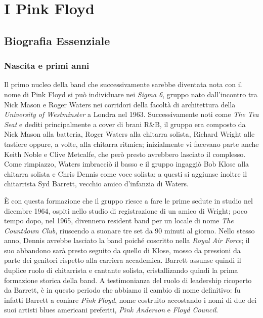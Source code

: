 \documentclass[class=book, crop=false, oneside, 12pt]{standalone}
\begin{document}
    \chapter{I Pink Floyd}

    \section{Biografia Essenziale}
    \subsection{Nascita e primi anni}
    Il primo nucleo della band che successivamente sarebbe diventata nota con il nome di Pink Floyd si può individuare nei \emph{Sigma 6}, gruppo nato dall'incontro tra Nick Mason e Roger Waters nei corridori della facoltà di architettura della \emph{University of Westminster} a Londra nel 1963. Successivamente noti come \emph{The Tea Seat} e dediti principalmente a cover di brani R\&B, il gruppo era composto da Nick Mason alla batteria, Roger Waters alla chitarra solista, Richard Wright alle tastiere oppure, a volte, alla chitarra ritmica; inizialmente vi facevano parte anche Keith Noble e Clive Metcalfe, che però presto avrebbero lasciato il complesso. Come rimpiazzo, Waters imbracciò il basso e il gruppo ingaggiò Bob Klose alla chitarra solista e Chris Dennis come voce solista; a questi si aggiunse inoltre il chitarrista Syd Barrett, vecchio amico d'infanzia di Waters.

    È con questa formazione che il gruppo riesce a fare le prime sedute in studio nel dicembre 1964, ospiti nello studio di registrazione di un amico di Wright; poco tempo dopo, nel 1965, divennero resident band per un locale di nome \emph{The Countdown Club}, riuscendo a suonare tre set da 90 minuti al giorno. Nello stesso anno, Dennis avrebbe lasciato la band poiché coscritto nella \emph{Royal Air Force}; il suo abbandono sarà presto seguito da quello di Klose, mosso da pressioni da parte dei genitori rispetto alla carriera accademica. Barrett assunse quindi il duplice ruolo di chitarrista e cantante solista, cristallizando quindi la prima formazione storica della band. A testimonianza del ruolo di leadership ricoperto da Barrett, è in questo periodo che abbiamo il cambio di nome definitivo: fu infatti Barrett a coniare \emph{Pink Floyd}, nome costruito accostando i nomi di due dei suoi artisti blues americani preferiti, \emph{Pink Anderson} e \emph{Floyd Council}.
\end{document}
